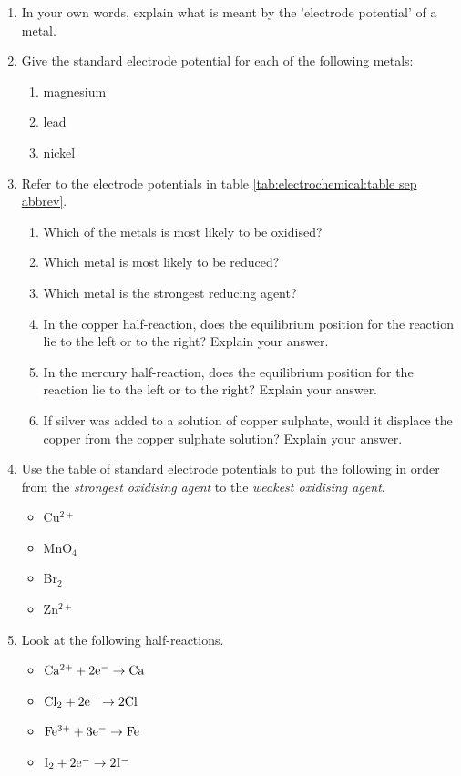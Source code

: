{
\begin{enumerate}
\item{In your own words, explain what is meant by the 'electrode potential' of a metal.}
\item{Give the standard electrode potential for each of the following metals:
	\begin{enumerate}
	\item{magnesium}
	\item{lead}
	\item{nickel}
	\end{enumerate}}
\item{Refer to the electrode potentials in table \ref{tab:electrochemical:table sep abbrev}.
	\begin{enumerate}
	\item{Which of the metals is most likely to be oxidised?}
	\item{Which metal is most likely to be reduced?}
	\item{Which metal is the strongest reducing agent?}
	\item{In the copper half-reaction, does the equilibrium position for the reaction lie to the left or to the right? Explain your answer.}
	\item{In the mercury half-reaction, does the equilibrium position for the reaction lie to the left or to the right? Explain your answer.}
	\item{If silver was added to a solution of copper sulphate, would it displace the copper from the copper sulphate solution? Explain your answer.}
	\end{enumerate}}
\item{Use the table of standard electrode potentials to put the following in order from the \textit{strongest oxidising agent} to the \textit{weakest oxidising agent}.
	\begin{itemize}
	\item{Cu$^{2+}$}
	\item{MnO$_{4}^{-}$}
	\item{Br$_{2}$}
	\item{Zn$^{2+}$}
	\end{itemize}}
\item{Look at the following half-reactions.
	\begin{itemize}
	\item{$\rm{Ca^{2+} + 2e^{-} \rightarrow Ca}$}
	\item{$\rm{Cl_{2} + 2e^{-} \rightarrow 2Cl}$}
	\item{$\rm{Fe^{3+} + 3e^{-} \rightarrow Fe}$}
	\item{$\rm{I_{2} + 2e^{-} \rightarrow 2I^{-}}$}
 	\end{itemize}

}
\end{enumerate}}
